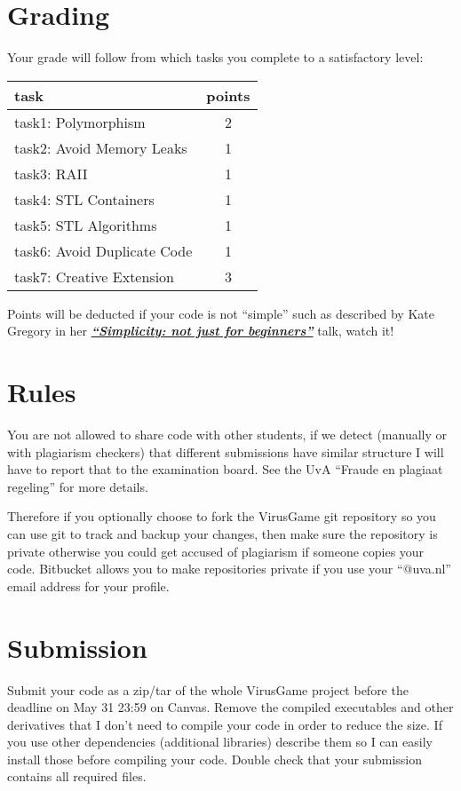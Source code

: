 \documentclass[12pt]{article}
\newcommand*{\link}[2]{\href{#1}{\color{blue}\textbf{\textit{#2}}}}
\begin{document}
\section{Grading}
Your grade will follow from which tasks you complete to a satisfactory
level:
\begin{center}
\begin{tabular}{ |l|c| } 
  \hline
  \textbf{task}               &  \textbf{points}\\ \hline
  task1: Polymorphism         &               2 \\
  task2: Avoid Memory Leaks   &               1 \\
  task3: RAII                 &               1 \\
  task4: STL Containers       &               1 \\
  task5: STL Algorithms       &               1 \\
  task6: Avoid Duplicate Code &               1 \\
  task7: Creative Extension   &               3 \\
  \hline
\end{tabular}
\end{center}

Points will be deducted if your code is not ``simple'' such as
described by Kate Gregory in her
\link{https://www.youtube.com/watch?v=O50qTuM5OT0} {``Simplicity: not
  just for beginners''} talk, watch it!

\section{Rules}
You are not allowed to share code with other students, if we detect
(manually or with plagiarism checkers) that different submissions have
similar structure I will have to report that to the examination
board. See the UvA ``Fraude en plagiaat regeling'' for more details.

Therefore if you optionally choose to fork the VirusGame git
repository so you can use git to track and backup your changes, then
make sure the repository is private otherwise you could get accused of
plagiarism if someone copies your code. Bitbucket allows you to make
repositories private if you use your ``@uva.nl'' email address for
your profile.

\section{Submission}
Submit your code as a zip/tar of the whole VirusGame project before
the deadline on May 31 23:59 on Canvas. Remove the compiled
executables and other derivatives that I don't need to compile your
code in order to reduce the size. If you use other dependencies
(additional libraries) describe them so I can easily install those
before compiling your code. Double check that your submission contains
all required files.
\end{document}
